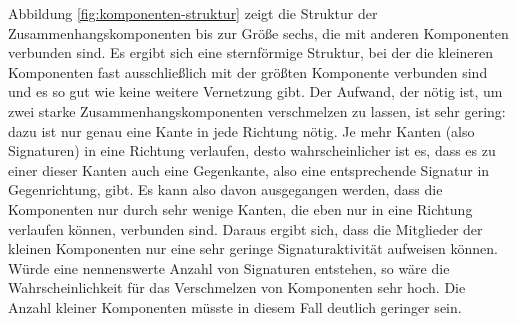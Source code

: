Abbildung \ref{fig:komponenten-struktur} zeigt die Struktur der
Zusammenhangskomponenten bis zur Größe sechs, die mit anderen
Komponenten verbunden sind. Es ergibt sich eine sternförmige
Struktur, bei der die kleineren Komponenten fast ausschließlich mit
der größten Komponente verbunden sind und es so gut wie keine
weitere Vernetzung gibt. Der Aufwand, der nötig ist, um zwei starke
Zusammenhangskomponenten verschmelzen zu lassen, ist sehr gering: dazu
ist nur genau eine Kante in jede Richtung nötig. Je mehr Kanten
(also Signaturen) in eine Richtung verlaufen, desto wahrscheinlicher
ist es, dass es zu einer dieser Kanten auch eine Gegenkante, also eine
entsprechende Signatur in Gegenrichtung, gibt. Es kann also davon
ausgegangen werden, dass die Komponenten nur durch sehr wenige Kanten,
die eben nur in eine Richtung verlaufen können, verbunden
sind. Daraus ergibt sich, dass die Mitglieder der kleinen Komponenten
nur eine sehr geringe Signaturaktivität aufweisen können. Würde
eine nennenswerte Anzahl von Signaturen entstehen, so wäre die
Wahrscheinlichkeit für das Verschmelzen von Komponenten sehr
hoch. Die Anzahl kleiner Komponenten müsste in diesem Fall deutlich
geringer sein.

